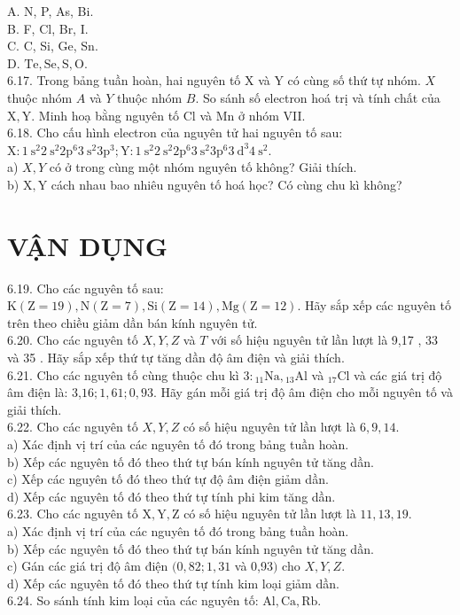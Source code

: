 \documentclass[10pt]{article}
\begin{document}
A. N, P, As, Bi.\\
B. F, Cl, Br, I.\\
C. C, Si, Ge, Sn.\\
D. $\mathrm{Te}, \mathrm{Se}, \mathrm{S}, \mathrm{O}$.\\
6.17. Trong bảng tuần hoàn, hai nguyên tố X và Y có cùng số thứ tự nhóm. $X$ thuộc nhóm $A$ và $Y$ thuộc nhóm $B$. So sánh số electron hoá trị và tính chất của $\mathrm{X}, \mathrm{Y}$. Minh hoạ bằng nguyên tố Cl và Mn ở nhóm VII.\\
6.18. Cho cấu hình electron của nguyên tử hai nguyên tố sau:\\
$\mathrm{X}: 1 \mathrm{~s}^{2} 2 \mathrm{~s}^{2} 2 \mathrm{p}^{6} 3 \mathrm{~s}^{2} 3 \mathrm{p}^{3} ; \mathrm{Y}: 1 \mathrm{~s}^{2} 2 \mathrm{~s}^{2} 2 \mathrm{p}^{6} 3 \mathrm{~s}^{2} 3 \mathrm{p}^{6} 3 \mathrm{~d}^{3} 4 \mathrm{~s}^{2}$.\\
a) $X, Y$ có ở trong cùng một nhóm nguyên tố không? Giải thích.\\
b) $\mathrm{X}, \mathrm{Y}$ cách nhau bao nhiêu nguyên tố hoá học? Có cùng chu kì không?

\section*{VẬN DỤNG}
6.19. Cho các nguyên tố sau: $\mathrm{K}(\mathrm{Z}=19), \mathrm{N}(\mathrm{Z}=7), \mathrm{Si}(\mathrm{Z}=14), \mathrm{Mg}(\mathrm{Z}=12)$. Hãy sắp xếp các nguyên tố trên theo chiều giảm dần bán kính nguyên tử.\\
6.20. Cho các nguyên tố $X, Y, Z$ và $T$ với số hiệu nguyên tử lần lượt là 9,17 , 33 và 35 . Hãy sắp xếp thứ tự tăng dần độ âm điện và giải thích.\\
6.21. Cho các nguyên tố cùng thuộc chu kì $3:{ }_{11} \mathrm{Na},{ }_{13} \mathrm{Al}$ và ${ }_{17} \mathrm{Cl}$ và các giá trị độ âm điện là: 3,$16 ; 1,61 ; 0,93$. Hãy gán mỗi giá trị độ âm điện cho mỗi nguyên tố và giải thích.\\
6.22. Cho các nguyên tố $X, Y, Z$ có số hiệu nguyên tử lần lượt là $6,9,14$.\\
a) Xác định vị trí của các nguyên tố đó trong bảng tuần hoàn.\\
b) Xếp các nguyên tố đó theo thứ tự bán kính nguyên tử tăng dần.\\
c) Xếp các nguyên tố đó theo thứ tự độ âm điện giảm dần.\\
d) Xếp các nguyên tố đó theo thứ tự tính phi kim tăng dần.\\
6.23. Cho các nguyên tố $\mathrm{X}, \mathrm{Y}, \mathrm{Z}$ có số hiệu nguyên tử lần lượt là $11,13,19$.\\
a) Xác định vị trí của các nguyên tố đó trong bảng tuần hoàn.\\
b) Xếp các nguyên tố đó theo thứ tự bán kính nguyên tử tăng dần.\\
c) Gán các giá trị độ âm điện $(0,82 ; 1,31$ và 0,93$)$ cho $X, Y, Z$.\\
d) Xếp các nguyên tố đó theo thứ tự tính kim loại giảm dần.\\
6.24. So sánh tính kim loại của các nguyên tố: $\mathrm{Al}, \mathrm{Ca}, \mathrm{Rb}$.
\end{document}
